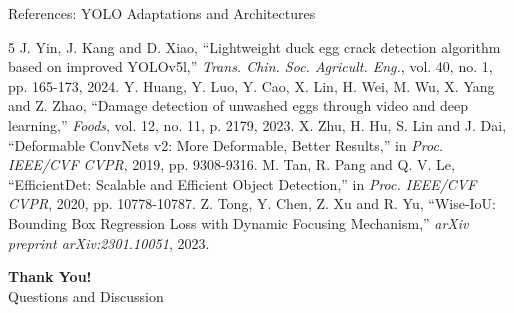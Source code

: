 \documentclass{beamer}
\begin{document}
\begin{frame}{References: YOLO Adaptations and Architectures}
\scriptsize
\begin{thebibliography}{5}
 J. Yin, J. Kang and D. Xiao, ``Lightweight duck egg crack detection algorithm based on improved YOLOv5l,'' \textit{Trans. Chin. Soc. Agricult. Eng.}, vol. 40, no. 1, pp. 165-173, 2024.
 Y. Huang, Y. Luo, Y. Cao, X. Lin, H. Wei, M. Wu, X. Yang and Z. Zhao, ``Damage detection of unwashed eggs through video and deep learning,'' \textit{Foods}, vol. 12, no. 11, p. 2179, 2023.
 X. Zhu, H. Hu, S. Lin and J. Dai, ``Deformable ConvNets v2: More Deformable, Better Results,'' in \textit{Proc. IEEE/CVF CVPR}, 2019, pp. 9308-9316.
 M. Tan, R. Pang and Q. V. Le, ``EfficientDet: Scalable and Efficient Object Detection,'' in \textit{Proc. IEEE/CVF CVPR}, 2020, pp. 10778-10787.
 Z. Tong, Y. Chen, Z. Xu and R. Yu, ``Wise-IoU: Bounding Box Regression Loss with Dynamic Focusing Mechanism,'' \textit{arXiv preprint arXiv:2301.10051}, 2023.
\end{thebibliography}
\end{frame}

\begin{frame}
\centering
\Huge \textbf{Thank You!} \\
\bigskip
\Large Questions and Discussion
\end{frame}
\end{document}
